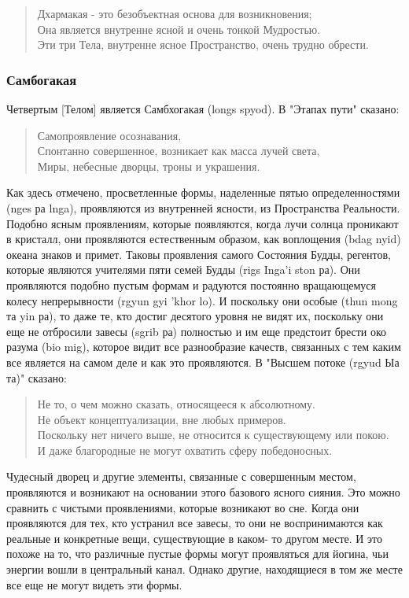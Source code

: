 \begin{verse}
Дхармакая - это безобъектная основа для возникновения;\\
Она является внутренне ясной и очень тонкой Мудростью.\\
Эти три Тела, внутренне ясное Пространство, очень трудно обрести.
\end{verse}

\subsubsection{Самбогакая}

Четвертым [Телом] является Самбхогакая (longs spyod). В "Этапах пути" сказано:

\begin{verse}
Самопроявление осознавания,\\
Спонтанно совершенное, возникает как масса лучей света,\\
Миры, небесные дворцы, троны и украшения.
\end{verse}

Как здесь отмечено, просветленные формы, наделенные пятью определенностями
(nges ра lnga), проявляются из внутренней ясности, из Пространства Реальности. Подобно
ясным проявлениям, которые появляются, когда лучи солнца проникают в кристалл, они
проявляются естественным образом, как воплощения (bdag nyid) океана знаков и примет.
Таковы проявления самого Состояния Будды, регентов, которые являются учителями пяти
семей Будды (rigs Inga’i ston ра). Они проявляются подобно пустым формам и радуются
постоянно вращающемуся колесу непрерывности (rgyun gyi 'khor lo). И поскольку они
особые (thun mong та yin ра), то даже те, кто достиг десятого уровня не видят их, поскольку
они еще не отбросили завесы (sgrib ра) полностью и им еще предстоит брести око разума
(bio mig), которое видит все разнообразие качеств, связанных с тем каким все является на
самом деле и как это проявляются. В "Высшем потоке (rgyud Ыа та)" сказано:

\begin{verse}
Не то, о чем можно сказать, относящееся к абсолютному.\\
Не объект концептуализации, вне любых примеров.\\
Поскольку нет ничего выше, не относится к существующему или покою.\\
И даже благородные не могут охватить сферу победоносных.
\end{verse}

Чудесный дворец и другие элементы, связанные с совершенным местом, проявляются
и возникают на основании этого базового ясного сияния. Это можно сравнить с чистыми
проявлениями, которые возникают во сне. Когда они проявляются для тех, кто устранил все
завесы, то они не воспринимаются как реальные и конкретные вещи, существующие в каком-
то другом месте. И это похоже на то, что различные пустые формы могут проявляться для
йогина, чьи энергии вошли в центральный канал. Однако другие, находящиеся в том же
месте все еще не могут видеть эти формы.

